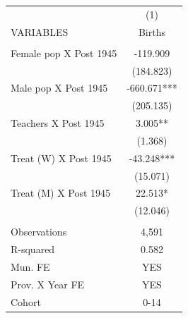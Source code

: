 \begin{tabular}{lc} \hline
 & (1) \\
VARIABLES & Births \\ \hline
 &  \\
Female pop X Post 1945 & -119.909 \\
 & (184.823) \\
Male pop X Post 1945 & -660.671*** \\
 & (205.135) \\
Teachers X Post 1945 & 3.005** \\
 & (1.368) \\
Treat (W) X Post 1945 & -43.248*** \\
 & (15.071) \\
Treat (M) X Post 1945 & 22.513* \\
 & (12.046) \\
 &  \\
Observations & 4,591 \\
R-squared & 0.582 \\
Mun. FE & YES \\
Prov. X Year FE & YES \\
 Cohort & 0-14 \\ \hline
\end{tabular}
